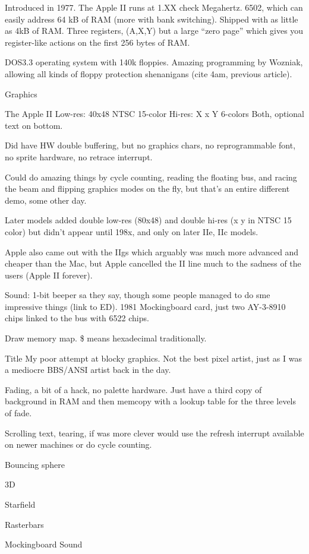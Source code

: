 \documentclass[twocolumn]{article}
\begin{document}
Introduced in 1977.
The Apple II runs at 1.XX check Megahertz.  6502, which can easily
address 64 kB of RAM (more with bank switching).  Shipped with as little
as 4kB of RAM.  Three registers, (A,X,Y) but a large ``zero page'' which
gives you register-like actions on the first 256 bytes of RAM.

DOS3.3 operating system with 140k floppies.  Amazing programming by Wozniak,
allowing all kinds of floppy protection shenanigans (cite 4am, previous
article).

Graphics

The Apple II
	Low-res: 40x48 NTSC 15-color 
	Hi-res: X x Y 6-colors
	Both, optional text on bottom.

Did have HW double buffering, but no graphics chars, no reprogrammable
font, no sprite hardware, no retrace interrupt.

Could do amazing things by cycle counting, reading the floating bus,
 and racing the beam and flipping 
graphics modes on the fly, but that's an entire different demo, some other day.

Later models added double low-res (80x48) and double hi-res (x y in
NTSC 15 color) but didn't appear until 198x, and only on later IIe, IIc
models.

Apple also came out with the IIgs which arguably was much more advanced
and cheaper than the Mac, but Apple cancelled the II line much to the
sadness of the users (Apple II forever).

Sound:
	1-bit beeper sa they say, though some people managed to
do sme impressive things (link to ED).  1981 Mockingboard
card, just two AY-3-8910 chips linked to the bus with 6522 chips.


Draw memory map.  \$ means hexadecimal traditionally.


Title
	My poor attempt at blocky graphics.  Not the best pixel artist,
	just as I was a mediocre BBS/ANSI artist back in the day.

	Fading, a bit of a hack, no palette hardware.  Just have
	a third copy of background in RAM and then memcopy with a lookup
	table for the three levels of fade.

	Scrolling text, tearing, if was more clever would use the
	refresh interrupt available on newer machines or do cycle counting.

Bouncing sphere

3D

Starfield

Rasterbars

Mockingboard Sound
\end{document}
